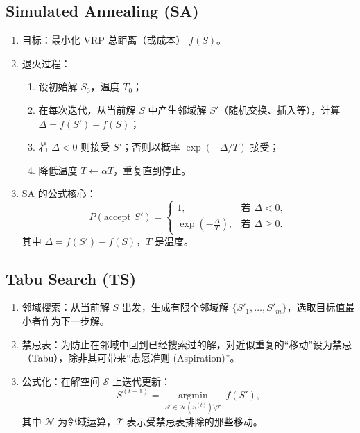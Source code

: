 \documentclass[12pt,a4paper,twoside]{ctexbook}
\begin{document}
\subsection{Simulated Annealing (SA)}
\begin{enumerate}
    \item 目标：最小化 VRP 总距离（或成本） $f(S)$。
    \item 退火过程：
    \begin{enumerate}
        \item 设初始解 $S_0$，温度 $T_0$；
        \item 在每次迭代，从当前解 $S$ 中产生邻域解 $S'$（随机交换、插入等），计算 $\Delta = f(S') - f(S)$；
        \item 若 $\Delta < 0$ 则接受 $S'$；否则以概率 $\exp(-\Delta/T)$ 接受；
        \item 降低温度 $T \leftarrow \alpha T$，重复直到停止。
    \end{enumerate}
    \item SA 的公式核心：
    \[
    P(\text{accept } S') = \begin{cases} 
    1, & \text{若 } \Delta <0,\\
    \exp\left(-\frac{\Delta}{T}\right), & \text{若 } \Delta \ge 0.
    \end{cases}
    \]
    其中 $\Delta = f(S')-f(S)$，$T$ 是温度。
\end{enumerate}

\subsection{Tabu Search (TS)}
\begin{enumerate}
    \item 邻域搜索：从当前解 $S$ 出发，生成有限个邻域解 $\{S'_1,\dots,S'_m\}$，选取目标值最小者作为下一步解。
    \item 禁忌表：为防止在邻域中回到已经搜索过的解，对近似重复的“移动”设为禁忌（Tabu），除非其可带来“志愿准则 (Aspiration)”。
    \item 公式化：在解空间 $\mathcal{S}$ 上迭代更新：
    \[
    S^{(t+1)} = \underset{S' \in \mathcal{N}(S^{(t)})\setminus \mathcal{T}}{\operatorname{argmin}}\,f(S'),
    \]
    其中 $\mathcal{N}$ 为邻域运算，$\mathcal{T}$ 表示受禁忌表排除的那些移动。
\end{enumerate}
\end{document}
